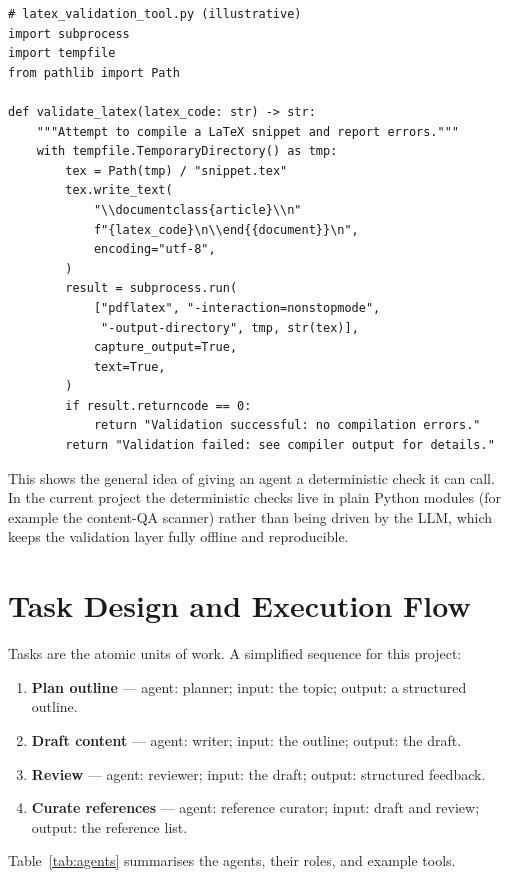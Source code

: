 \begin{verbatim}
# latex_validation_tool.py (illustrative)
import subprocess
import tempfile
from pathlib import Path

def validate_latex(latex_code: str) -> str:
    """Attempt to compile a LaTeX snippet and report errors."""
    with tempfile.TemporaryDirectory() as tmp:
        tex = Path(tmp) / "snippet.tex"
        tex.write_text(
            "\\documentclass{article}\\n"
            f"{latex_code}\n\\end{{document}}\n",
            encoding="utf-8",
        )
        result = subprocess.run(
            ["pdflatex", "-interaction=nonstopmode",
             "-output-directory", tmp, str(tex)],
            capture_output=True,
            text=True,
        )
        if result.returncode == 0:
            return "Validation successful: no compilation errors."
        return "Validation failed: see compiler output for details."
\end{verbatim}

This shows the general idea of giving an agent a deterministic check it can
call. In the current project the deterministic checks live in plain Python
modules (for example the content-QA scanner) rather than being driven by the
LLM, which keeps the validation layer fully offline and reproducible.

\section{Task Design and Execution Flow}

Tasks are the atomic units of work. A simplified sequence for this project:

\begin{enumerate}
  \item \textbf{Plan outline} --- agent: planner; input: the topic; output:
        a structured outline.
  \item \textbf{Draft content} --- agent: writer; input: the outline;
        output: the draft.
  \item \textbf{Review} --- agent: reviewer; input: the draft; output:
        structured feedback.
  \item \textbf{Curate references} --- agent: reference curator; input:
        draft and review; output: the reference list.
\end{enumerate}

Table~\ref{tab:agents} summarises the agents, their roles, and example
tools.

